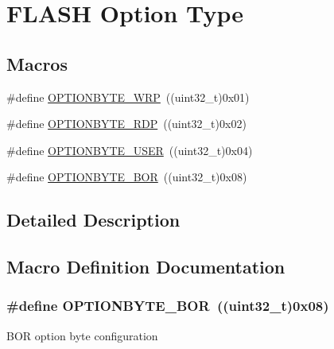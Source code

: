 \hypertarget{group___f_l_a_s_h_ex___option___type}{}\section{F\+L\+A\+SH Option Type}
\label{group___f_l_a_s_h_ex___option___type}
\subsection*{Macros}
\begin{DoxyCompactItemize}
\item 
\#define \hyperlink{group___f_l_a_s_h_ex___option___type_ga48712a166ea192ddcda0f2653679f9ec}{O\+P\+T\+I\+O\+N\+B\+Y\+T\+E\+\_\+\+W\+RP}~((uint32\+\_\+t)0x01)
\item 
\#define \hyperlink{group___f_l_a_s_h_ex___option___type_ga8f0bdb21ef13bae39d5d8b6619e2df06}{O\+P\+T\+I\+O\+N\+B\+Y\+T\+E\+\_\+\+R\+DP}~((uint32\+\_\+t)0x02)
\item 
\#define \hyperlink{group___f_l_a_s_h_ex___option___type_gac7d843e666e15c79688a1914e8ffe7a5}{O\+P\+T\+I\+O\+N\+B\+Y\+T\+E\+\_\+\+U\+S\+ER}~((uint32\+\_\+t)0x04)
\item 
\#define \hyperlink{group___f_l_a_s_h_ex___option___type_gaf4063216c8386467d187663190936c07}{O\+P\+T\+I\+O\+N\+B\+Y\+T\+E\+\_\+\+B\+OR}~((uint32\+\_\+t)0x08)
\end{DoxyCompactItemize}


\subsection{Detailed Description}


\subsection{Macro Definition Documentation}
\subsubsection[{\texorpdfstring{O\+P\+T\+I\+O\+N\+B\+Y\+T\+E\+\_\+\+B\+OR}{OPTIONBYTE_BOR}}]{\setlength{\rightskip}{0pt plus 5cm}\#define O\+P\+T\+I\+O\+N\+B\+Y\+T\+E\+\_\+\+B\+OR~((uint32\+\_\+t)0x08)}\hypertarget{group___f_l_a_s_h_ex___option___type_gaf4063216c8386467d187663190936c07}{}\label{group___f_l_a_s_h_ex___option___type_gaf4063216c8386467d187663190936c07}
B\+OR option byte configuration 
